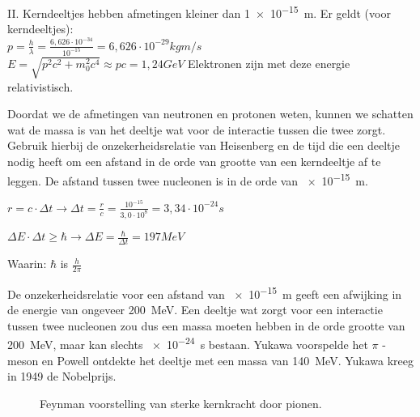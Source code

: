 \begin{questions}
II. Kerndeeltjes hebben afmetingen kleiner dan \SI{1e-15}{\meter}. 
Er geldt (voor kerndeeltjes):\\
$p = \frac{h}{\lambda} = \frac{6,626\cdot 10^{-34}}{10^{-15}} = 6,626 \cdot 10^{-29} kgm/s$\\
$E= \sqrt{p^{2}c^{2}+m_0^{2}c^{4}} \approx pc = 1,24 GeV$
Elektronen zijn met deze energie relativistisch. 


\question
Doordat we de afmetingen van neutronen en protonen weten, kunnen we schatten wat 
de massa is van het deeltje wat voor de interactie tussen die twee zorgt.
Gebruik hierbij de onzekerheidsrelatie van Heisenberg en de tijd die een deeltje
nodig heeft om een afstand in de orde van grootte van een kerndeeltje af te leggen.
De afstand tussen twee nucleonen is in de orde van \SI{e-15}{m}.

 
$r = c \cdot \Delta t \rightarrow \Delta t = \frac{r}{c} = \frac{10^{-15}}{3,0\cdot 10^{8}}= 3,34\cdot 10^{-24} s$

$\Delta E \cdot \Delta t \geq \hbar \rightarrow \Delta E = \frac {\hbar}{\Delta t} = 197 MeV$

Waarin: $\hbar$ is $ \frac{h}{2\pi}$
 

De onzekerheidsrelatie voor een afstand van \SI{e-15}{m} geeft een afwijking in de energie van 
ongeveer \SI{200}{\mega\electronvolt}. Een deeltje wat zorgt voor een interactie tussen 
twee nucleonen zou dus een massa moeten hebben in de orde grootte van \SI{200}{\mega\electronvolt},
maar kan slechts \SI{e-24}{\second} bestaan. Yukawa voorspelde het $\pi$ -meson en Powell ontdekte het deeltje 
met een massa van \SI{140}{\mega\electronvolt}. Yukawa kreeg in 1949 de Nobelprijs.

\begin{figure}
\caption{ Feynman voorstelling van sterke kernkracht door pionen.}
\end{figure}
\end{questions}

